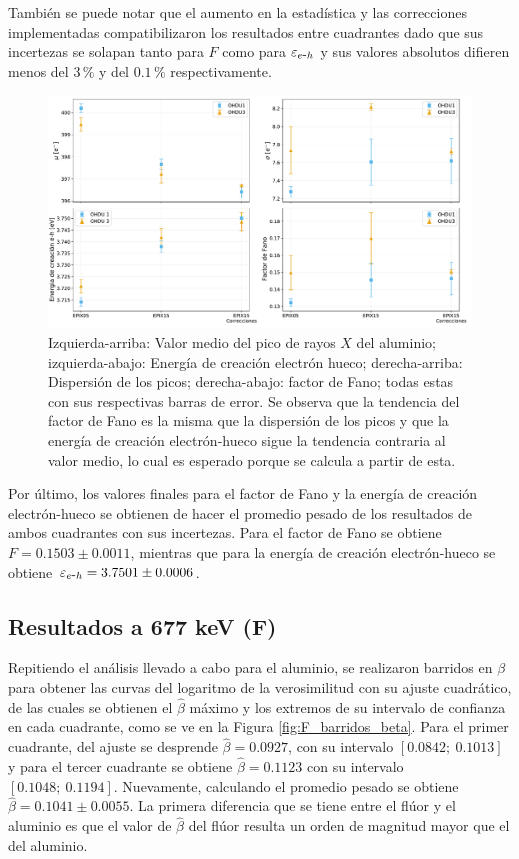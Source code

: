 También se puede notar que el aumento en la estadística y las correcciones implementadas compatibilizaron los resultados entre cuadrantes dado que sus incertezas se solapan tanto para $F$ como para $\varepsilon_{e\mbox{-}h}$ y sus valores absolutos difieren menos del $3\,\%$ y del $0.1\,\%$ respectivamente.
\begin{figure}[h]
    \centering
        \includegraphics[scale=0.45]{Figs/Al_mu_sigma_fano_Eeh.pdf}
    \caption{Izquierda-arriba: Valor medio del pico de rayos $X$ del aluminio; izquierda-abajo: Energía de creación electrón hueco; derecha-arriba: Dispersión de los picos; derecha-abajo: factor de Fano; todas estas con sus respectivas barras de error. Se observa que la tendencia del factor de Fano es la misma que la dispersión de los picos y que la energía de creación electrón-hueco sigue la tendencia contraria al valor medio, lo cual es esperado porque se calcula a partir de esta.}
    \label{fig:Al_mu_sigma_fano_eh}
\end{figure}

Por último, los valores finales para el factor de Fano y la energía de creación electrón-hueco se obtienen de hacer el promedio pesado de los resultados de ambos cuadrantes con sus incertezas. Para el factor de Fano se obtiene $ F = 0.1503 \pm 0.0011 $, mientras que para la energía de creación electrón-hueco se obtiene $\varepsilon_{e\mbox{-}h} = 3.7501 \pm 0.0006 $.
\subsection{Resultados a 677 keV (F)}
\noindent Repitiendo el análisis llevado a cabo para el aluminio, se realizaron barridos en $\beta$ para obtener las curvas del logaritmo de la verosimilitud con su ajuste cuadrático, de las cuales se obtienen el $\hat{\beta}$ máximo y los extremos de su intervalo de confianza en cada cuadrante, como se ve en la Figura \ref{fig:F_barridos_beta}. Para el primer cuadrante, del ajuste se desprende $\hat{\beta} = 0.0927 $, con su intervalo $[0.0842;\ 0.1013]$ y para el tercer cuadrante se obtiene $\hat{\beta} = 0.1123 $ con su intervalo $[0.1048;\ 0.1194]$. Nuevamente, calculando el promedio pesado se obtiene $\hat{\beta} = 0.1041 \pm 0.0055 $. La primera diferencia que se tiene entre el flúor y el aluminio es que el valor de $\hat{\beta}$ del flúor resulta un orden de magnitud mayor que el del aluminio.

